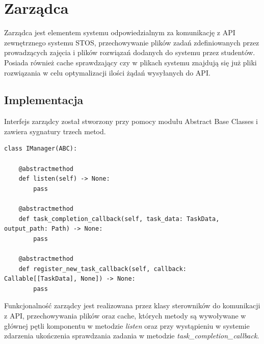 \section{Zarządca}
Zarządca jest elementem systemu odpowiedzialnym za komunikację z API zewnętrznego systemu STOS, przechowywanie plików zadań zdefiniowanych przez prowadzących zajęcia i plików rozwiązań dodanych do systemu przez studentów. Posiada również cache sprawdzający czy w plikach systemu znajdują się już pliki rozwiązania w celu optymalizacji ilości żądań wysyłanych do API.

\subsection{Implementacja}
Interfejs zarządcy został stworzony przy pomocy modułu Abstract Base Classes\cite{pythonAbc} i zawiera sygnatury trzech metod.
\lstset{style=python}
\begin{lstlisting}[caption = {Interfejs zarządcy.}]
    class IManager(ABC):

    @abstractmethod
    def listen(self) -> None:
        pass

    @abstractmethod
    def task_completion_callback(self, task_data: TaskData, output_path: Path) -> None:
        pass

    @abstractmethod
    def register_new_task_callback(self, callback: Callable[[TaskData], None]) -> None:
        pass
\end{lstlisting}
Funkcjonalność zarządcy jest realizowana przez klasy sterowników do komunikacji z API, przechowywania plików oraz cache, których metody są wywoływane w głównej pętli komponentu w metodzie \textit{listen} oraz przy wystąpieniu w systemie zdarzenia ukończenia sprawdzania zadania w metodzie \textit{task\_completion\_callback}.

